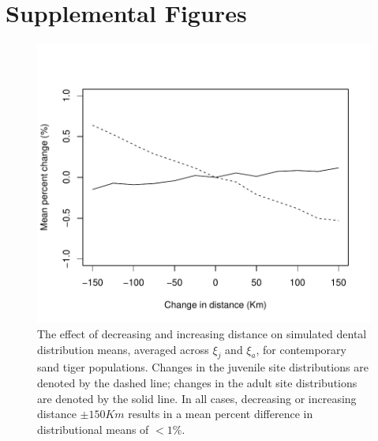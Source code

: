 \documentclass[]{rsos}%
\begin{document}
\section{Supplemental Figures}


\begin{figure}[ht]
  \centering
  \includegraphics[width=1\linewidth]{fig_distance_modern.pdf}  

\caption{The effect of decreasing and increasing distance on simulated dental distribution means, averaged across $\xi_j$ and $\xi_a$, for contemporary sand tiger populations. Changes in the juvenile site distributions are denoted by the dashed line; changes in the adult site distributions are denoted by the solid line. In all cases, decreasing or increasing distance $\pm 150 Km$ results in a mean percent difference in distributional means of $<1\%$. 
}
\label{fig:distance}
\end{figure}
\end{document}
